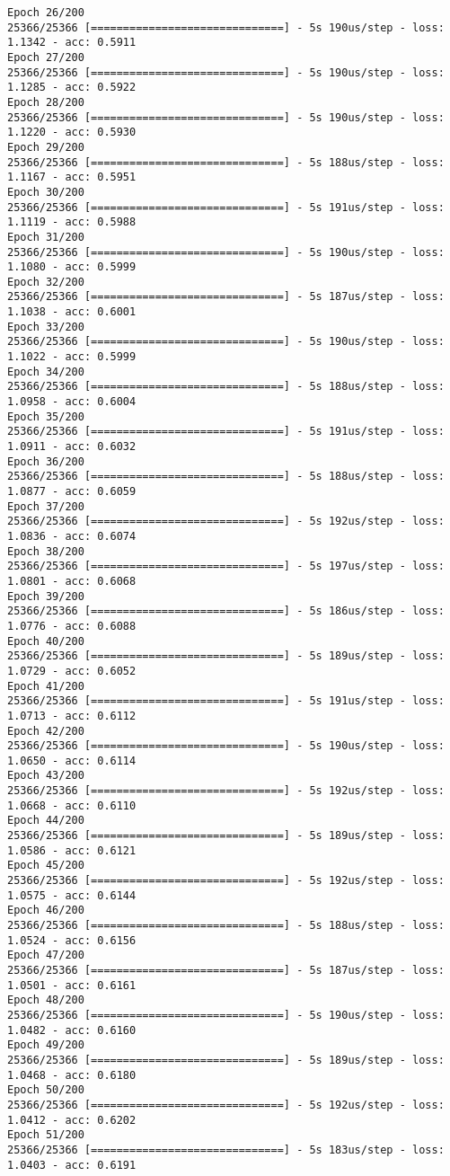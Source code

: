 \documentclass[11pt]{article}
\begin{document}
\begin{Verbatim}[commandchars=\\\{\}]
Epoch 26/200
25366/25366 [==============================] - 5s 190us/step - loss: 1.1342 - acc: 0.5911
Epoch 27/200
25366/25366 [==============================] - 5s 190us/step - loss: 1.1285 - acc: 0.5922
Epoch 28/200
25366/25366 [==============================] - 5s 190us/step - loss: 1.1220 - acc: 0.5930
Epoch 29/200
25366/25366 [==============================] - 5s 188us/step - loss: 1.1167 - acc: 0.5951
Epoch 30/200
25366/25366 [==============================] - 5s 191us/step - loss: 1.1119 - acc: 0.5988
Epoch 31/200
25366/25366 [==============================] - 5s 190us/step - loss: 1.1080 - acc: 0.5999
Epoch 32/200
25366/25366 [==============================] - 5s 187us/step - loss: 1.1038 - acc: 0.6001
Epoch 33/200
25366/25366 [==============================] - 5s 190us/step - loss: 1.1022 - acc: 0.5999
Epoch 34/200
25366/25366 [==============================] - 5s 188us/step - loss: 1.0958 - acc: 0.6004
Epoch 35/200
25366/25366 [==============================] - 5s 191us/step - loss: 1.0911 - acc: 0.6032
Epoch 36/200
25366/25366 [==============================] - 5s 188us/step - loss: 1.0877 - acc: 0.6059
Epoch 37/200
25366/25366 [==============================] - 5s 192us/step - loss: 1.0836 - acc: 0.6074
Epoch 38/200
25366/25366 [==============================] - 5s 197us/step - loss: 1.0801 - acc: 0.6068
Epoch 39/200
25366/25366 [==============================] - 5s 186us/step - loss: 1.0776 - acc: 0.6088
Epoch 40/200
25366/25366 [==============================] - 5s 189us/step - loss: 1.0729 - acc: 0.6052
Epoch 41/200
25366/25366 [==============================] - 5s 191us/step - loss: 1.0713 - acc: 0.6112
Epoch 42/200
25366/25366 [==============================] - 5s 190us/step - loss: 1.0650 - acc: 0.6114
Epoch 43/200
25366/25366 [==============================] - 5s 192us/step - loss: 1.0668 - acc: 0.6110
Epoch 44/200
25366/25366 [==============================] - 5s 189us/step - loss: 1.0586 - acc: 0.6121
Epoch 45/200
25366/25366 [==============================] - 5s 192us/step - loss: 1.0575 - acc: 0.6144
Epoch 46/200
25366/25366 [==============================] - 5s 188us/step - loss: 1.0524 - acc: 0.6156
Epoch 47/200
25366/25366 [==============================] - 5s 187us/step - loss: 1.0501 - acc: 0.6161
Epoch 48/200
25366/25366 [==============================] - 5s 190us/step - loss: 1.0482 - acc: 0.6160
Epoch 49/200
25366/25366 [==============================] - 5s 189us/step - loss: 1.0468 - acc: 0.6180
Epoch 50/200
25366/25366 [==============================] - 5s 192us/step - loss: 1.0412 - acc: 0.6202
Epoch 51/200
25366/25366 [==============================] - 5s 183us/step - loss: 1.0403 - acc: 0.6191

\end{Verbatim}
\end{document}
